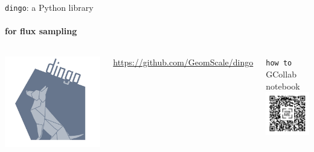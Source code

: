 \documentclass{beamer}
\begin{document}
   \begin{frame}{\texttt{dingo}: a Python library }
      \framesubtitle{for flux sampling}

      \begin{columns}[onlytextwidth]

            \includegraphics[scale=0.1]{ ../met_nets/resources//dingo5_transparent.png}
         
            \href{https://github.com/GeomScale/dingo}{https://github.com/GeomScale/dingo}


            \begin{center}
               \texttt{how to} GCollab notebook
               \includegraphics[scale=0.3]{ ../met_nets/resources//dingo_collab_transparent.png}               
            \end{center}
 
      \end{columns}
   \end{frame}
   \fi 
\end{document}
